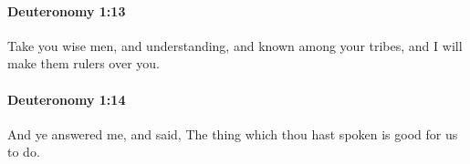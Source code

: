 		\paragraph{Deuteronomy 1:13} %
			\label{DEUTERONOMY-1-13}

			Take you wise men, and understanding, and known among your tribes, and I will make them rulers over you.


		\paragraph{Deuteronomy 1:14} %
			\label{DEUTERONOMY-1-14}

			And ye answered me, and said, The thing which thou hast spoken is good for us to do.


